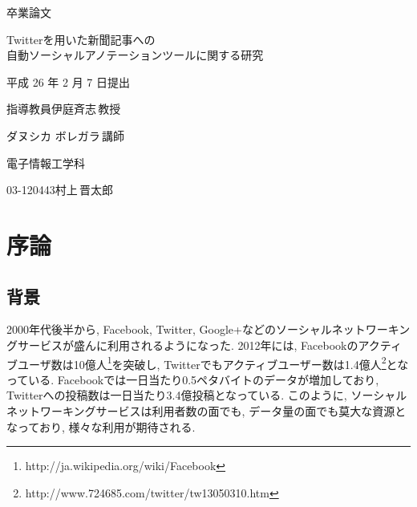 \documentclass[12pt]{jarticle}
\begin{document}
\pagestyle{empty}
\begin{center}
  \vspace*{3.0cm}
  {\fontsize{80pt}{100pt}\selectfont 卒業論文}

  \vspace*{2.0cm}

  \begin{LARGE}
    Twitterを用いた新聞記事への\\
    自動ソーシャルアノテーションツールに関する研究
    \vspace*{2.0cm}

    平成 26 年 2 月 7 日提出
  \end{LARGE}

\end{center}
\begin{LARGE}
  \vspace*{1.0cm}
  \hspace{25mm}指導教員\hspace{51mm}伊庭斉志\,教授

  \hspace{70mm}ダヌシカ ボレガラ\,講師

  \vspace*{1.0cm}
  \begin{center}
    電子情報工学科

    \vspace{1.0cm}
    03-120443\hspace{15mm}村上\,晋太郎
  \end{center}

\end{LARGE}

\newpage
\tableofcontents

\newpage
\setcounter{page}{1}
\pagestyle{plain}

\section{序論}
\subsection{背景}
2000年代後半から, Facebook, Twitter, Google+などのソーシャルネットワーキングサービスが盛んに利用されるようになった. 2012年には, Facebookのアクティブユーザ数は10億人\footnote{http://ja.wikipedia.org/wiki/Facebook}を突破し, Twitterでもアクティブユーザー数は1.4億人\footnote{http://www.724685.com/twitter/tw13050310.htm}となっている. Facebookでは一日当たり0.5ペタバイトのデータが増加しており, Twitterへの投稿数は一日当たり3.4億投稿となっている. 
このように, ソーシャルネットワーキングサービスは利用者数の面でも, データ量の面でも莫大な資源となっており, 様々な利用が期待される. 
\end{document}
